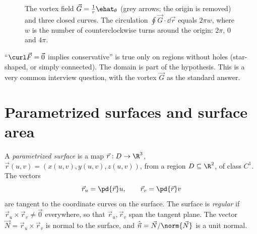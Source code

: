 \begin{figure}[ht]
\centering
{}
\caption{The vortex field $\vec G=\frac1r\ehat_\theta$ (grey arrows; the origin is removed) and three closed curves. The circulation $\oint\vec G\cdot\dd\vec r$ equals $2\pi w$, where $w$ is the number of counterclockwise turns around the origin: $2\pi$, $0$ and $4\pi$.}
\label{fig:winding}
\end{figure}

\begin{pitfall}
``$\curl\vec F=\vec0$ implies conservative'' is true only on regions without holes (star-shaped, or simply connected). The domain is part of the hypothesis. This is a very common interview question, with the vortex $\vec G$ as the standard answer.
\end{pitfall}

\section{Parametrized surfaces and surface area}

A \emph{parametrized surface} is a map $\vec r:D\to\R^3$, $\vec r(u,v)=(x(u,v),y(u,v),z(u,v))$, from a region $D\subseteq\R^2$, of class $C^1$. The vectors
\[
\vec r_u=\pd{\vec r}u,\qquad\vec r_v=\pd{\vec r}v
\]
are tangent to the coordinate curves on the surface. The surface is \emph{regular} if $\vec r_u\times\vec r_v\ne\vec 0$ everywhere, so that $\vec r_u,\vec r_v$ span the tangent plane. The vector $\vec N=\vec r_u\times\vec r_v$ is normal to the surface, and $\hat{\vec n}=\vec N/\norm{\vec N}$ is a unit normal.

